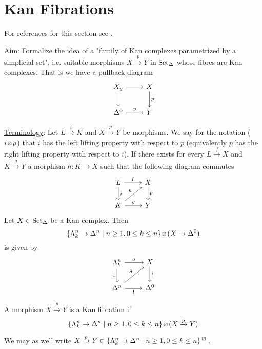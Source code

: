 \section{Kan Fibrations}

For references for this section see \cite[Section I.3]{GoerSimp1999}.

Aim: Formalize the idea of a "family of Kan complexes parametrized by a simplicial set", i.e. suitable morphisms $X \xrightarrow{p} Y$ in $\operatorname{Set}_{\Delta}$ whose fibres are Kan complexes.
That is we have a pullback diagram
\[
\begin{tikzcd}
    X_y
    \arrow[d]
    \ar[r]
    &
    X
    \ar[d,"p"]
    \\
    \Delta^0
    \ar[r,"y"]
    &
    Y    
\end{tikzcd}
\]

\underline{Terminology}:
Let $ L \xrightarrow{i} K$ and $ X \xrightarrow{p} Y$ be morphisms.
We say for the notation ($ i \lift{} p$) that $i$ has the left lifting property with respect to $p$ (equivalently $p$ has the right lifting property with respect to $i$).
If there exists for every $L \xrightarrow{f} X$ and $K \xrightarrow{g}Y$ a morphism $h:K \to X$ such that the following diagram commutes
\[
\begin{tikzcd}
    L
    \arrow[d,"i"]
    \ar[r, "f"]
    &
    X
    \ar[d,"p"]
    \\
    K
    \ar[ru,"h"]
    \ar[r,"g"]
    &
    Y    
\end{tikzcd}
\]
Let $X \in \operatorname{Set}_{\Delta}$ be a Kan complex. 
Then 
\[
\{ \Lambda_k^n \to \Delta^n \mid n\geq 1 ,0 \leq k \leq n \} \lift{} (X \to \Delta^0)
\]
is given by 
\[
\begin{tikzcd}
    \Lambda_k^n
    \arrow[d,"\iota"']
    \ar[r, "\sigma"]
    &
    X
    \ar[d,"!"]
    \\
    \Delta^n
    \ar[ru,"\Tilde{\sigma}"]
    \ar[r,"!"']
    &
    \Delta^0
\end{tikzcd}
\]

\begin{defi}
    A morphism $X \xrightarrow{p} Y$ is a Kan fibration if 
    \[
    \{ \Lambda_k^n \to \Delta^n \mid n\geq 1 ,0 \leq k \leq n \} \lift{} (X \xrightarrow{p} Y)
    \]
\end{defi}

\begin{rmk}
    We may as well write $X \xrightarrow{p} Y \in \{ \Lambda_k^n \to \Delta^n \mid n\geq 1 , 0 \leq k \leq n\}^{\lift{}}$.
\end{rmk}

